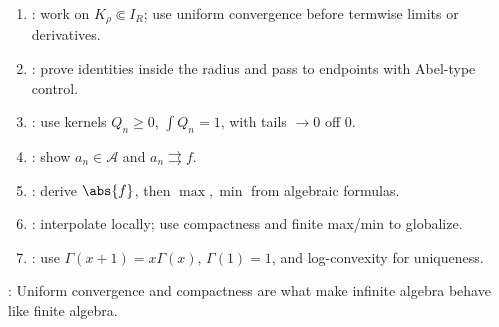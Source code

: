 \begin{method} \label{meth:power-approx-fourier-proof-patterns-source-todo}\label{meth:power-series-approximation-proof-patterns} 
\begin{enumerate}[label=(\roman*)]
\setlength{\itemsep}{0pt}
\item {}: work on $K_\rho\Subset I_R$; use uniform convergence before termwise limits or derivatives.
\item {}: prove identities inside the radius and pass to endpoints with Abel-type control.
\item {}: use kernels $Q_n\geq0$, $\int Q_n=1$, with tails $\to0$ off $0$.
\item {}: show $a_n\in\mathcal{A}$ and $a_n\rightrightarrows f$.
\item {}: derive $\abs{f}$, then $\max,\min$ from algebraic formulas.
\item {}: interpolate locally; use compactness and finite max/min to globalize.
\item {}: use $\Gamma(x+1)=x\Gamma(x)$, $\Gamma(1)=1$, and log-convexity for uniqueness.
\end{enumerate}
: Uniform convergence and compactness are what make infinite algebra behave like finite algebra.
\end{method}
